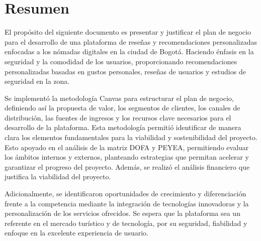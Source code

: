 \section{Resumen}
\noindent
El propósito del siguiente documento es presentar y justificar el plan de negocio para el desarrollo de una plataforma de reseñas y recomendaciones personalizadas enfocadas a los nómadas digitales en la ciudad de Bogotá. Haciendo énfasis en la seguridad y la comodidad de los usuarios, proporcionando recomendaciones personalizadas basadas en gustos personales, reseñas de usuarios y estudios de seguridad en la zona.

Se implementó la metodología Canvas para estructurar el plan de negocio, definiendo así la propuesta de valor, los segmentos de clientes, los canales de distribución, las fuentes de ingresos y los recursos clave necesarios para el desarrollo de la plataforma. Esta metodología permitió identificar de manera clara los elementos fundamentales para la viabilidad y sostenibilidad del proyecto.
Esto apoyado en el análisis de la matriz DOFA y PEYEA, permitiendo evaluar los ámbitos internos y externos, planteando estrategias que permitan acelerar y garantizar el progreso del proyecto. Además, se realizó el análisis financiero que justifica la viabilidad del proyecto.

Adicionalmente, se identificaron oportunidades de crecimiento y diferenciación frente a la competencia mediante la integración de tecnologías innovadoras y la personalización de los servicios ofrecidos. Se espera que la plataforma sea un referente en el mercado turístico y de tecnología, por su seguridad, fiabilidad y enfoque en la excelente experiencia de usuario.